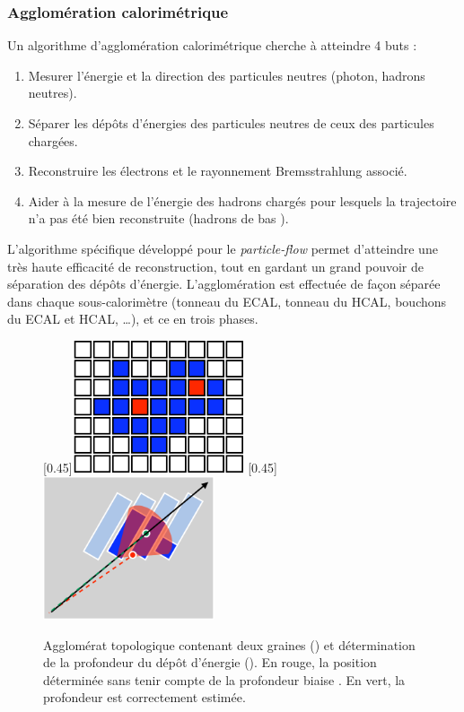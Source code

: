 \subsubsection{Agglomération calorimétrique}

Un algorithme d'agglomération calorimétrique cherche à atteindre 4 buts :
\begin{enumerate}
  \item Mesurer l'énergie et la direction des particules neutres (photon, hadrons neutres).
  \item Séparer les dépôts d'énergies des particules neutres de ceux des particules chargées.
  \item Reconstruire les électrons et le rayonnement Bremsstrahlung associé.
  \item Aider à la mesure de l'énergie des hadrons chargés pour lesquels la trajectoire n'a pas été bien reconstruite (hadrons de bas \pt).
\end{enumerate}

L'algorithme spécifique développé pour le \emph{particle-flow} permet d'atteindre une très haute efficacité de reconstruction, tout en gardant un grand pouvoir de séparation des dépôts d'énergie. L'agglomération est effectuée de façon séparée dans chaque sous-calorimètre (tonneau du ECAL, tonneau du HCAL, bouchons du ECAL et HCAL, \ldots), et ce en trois phases.

\medskip

\begin{figure}
  \subcaptionbox{\label{fig:calo_topo}}[0.45\textwidth]{\includegraphics[width=0.45\textwidth]{chapitre3/figs/calo_topoclus_seeds.pdf}}\hfill
  \subcaptionbox{\label{fig:calo_depth}}[0.45\textwidth]{\includegraphics[width=0.45\textwidth]{chapitre3/figs/calo_depthcor.pdf}}
  \caption{Agglomérat topologique contenant deux graines () et détermination de la profondeur du dépôt d'énergie (). En rouge, la position déterminée sans tenir compte de la profondeur biaise \aeta. En vert, la profondeur est correctement estimée.}
\end{figure}

